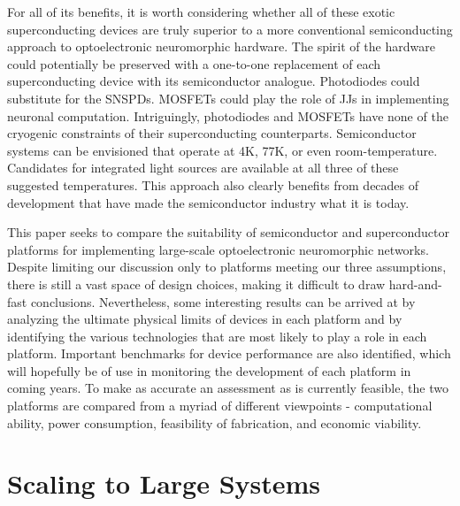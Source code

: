 \documentclass[twocolumn]{article}
\begin{document}
For all of its benefits, it is worth considering whether all of these exotic superconducting devices are truly superior to a more conventional semiconducting approach to optoelectronic neuromorphic hardware. The spirit of the hardware could potentially be preserved with a one-to-one replacement of each superconducting device with its semiconductor analogue. Photodiodes could substitute for the SNSPDs. MOSFETs could play the role of JJs in implementing neuronal computation. Intriguingly, photodiodes and MOSFETs have none of the cryogenic constraints of their superconducting counterparts. Semiconductor systems can be envisioned that operate at 4K, 77K, or even room-temperature. Candidates for integrated light sources are available at all three of these suggested temperatures. This approach also clearly benefits from decades of development that have made the semiconductor industry what it is today.

This paper seeks to compare the suitability of semiconductor and superconductor platforms for implementing large-scale optoelectronic neuromorphic networks. Despite limiting our discussion only to platforms meeting our three assumptions, there is still a vast space of design choices, making it difficult to draw hard-and-fast conclusions. Nevertheless, some interesting results can be arrived at by analyzing the ultimate physical limits of devices in each platform and by identifying the various technologies that are most likely to play a role in each platform. Important benchmarks for device performance are also identified, which will hopefully be of use in monitoring the development of each platform in coming years. To make as accurate an assessment as is currently feasible, the two platforms are compared from a myriad of different viewpoints - computational ability, power consumption, feasibility of fabrication, and economic viability. 

\section{Scaling to Large Systems}
\end{document}
